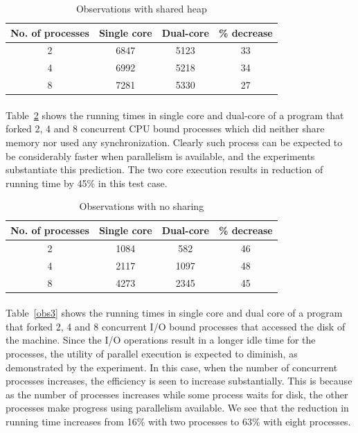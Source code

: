 \documentclass[12pt]{report}
\begin{document}
\begin{table}[h!]
    \centering
    \begin{tabular}{|c|c|c|c|}
        \hline
        \textbf{No. of processes} & \textbf{Single core} & \textbf{Dual-core} & \textbf{\% decrease}\\
        \hline
        2 & 6847 & 5123 & 33 \\
        \hline
        4 & 6992 & 5218 & 34 \\
        \hline
        8 & 7281 & 5330 & 27 \\
        \hline
    \end{tabular}
    \caption{Observations with shared heap}
    \label{obs1}
\end{table}

\paragraph{}
Table~\ref{obs2} shows the running times in single core and dual-core of a program that forked 2, 4 and 8 concurrent CPU bound processes which did neither share memory nor used any synchronization. Clearly such process can be expected to be considerably faster when parallelism is available, and the experiments substantiate this prediction. The two core execution results in reduction of running time by 45\% in this test case.

\begin{table}[h!]
    \centering
    \begin{tabular}{|c|c|c|c|}
        \hline
        \textbf{No. of processes} & \textbf{Single core} & \textbf{Dual-core} & \textbf{\% decrease}\\
        \hline
        2 & 1084 & 582 & 46 \\
        \hline
        4 & 2117 & 1097 & 48 \\
        \hline
        8 & 4273 & 2345 & 45 \\
        \hline
    \end{tabular}
    \caption{Observations with no sharing}
    \label{obs2}
\end{table}

\paragraph{}
Table~\ref{obs3} shows the running times in single core and dual core of a program that forked 2, 4 and 8 concurrent I/O bound processes that accessed the disk of the machine. Since the I/O operations result in a longer idle time for the processes, the utility of parallel execution is expected to diminish, as demonstrated by the experiment. In this case, when the number of concurrent processes increases, the efficiency is seen to increase substantially. This is because as the number of processes increases while some process waits for disk, the other processes make progress using parallelism available. We see that the reduction in running time increases from 16\% with two processes to 63\% with eight processes.
\end{document}
